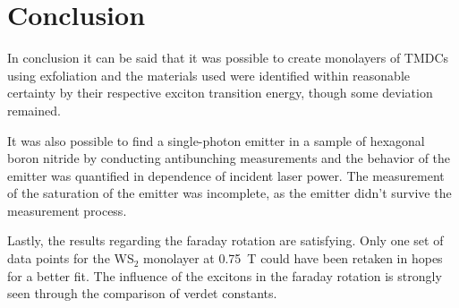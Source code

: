 \newpage
\section{Conclusion}


  In conclusion it can be said that it was possible to create monolayers of TMDCs using exfoliation and the materials used were identified within reasonable certainty by their respective exciton transition energy, though some deviation remained.

  It was also possible to find a single-photon emitter in a sample of hexagonal boron nitride by conducting antibunching measurements and the behavior of the emitter was quantified in dependence of incident laser power.
  The measurement of the saturation of the emitter was incomplete, as the emitter didn't survive the measurement process.

  Lastly, the results regarding the faraday rotation are satisfying. Only one set of data points for the WS$_2$ monolayer at \SI{0.75}{\tesla} could have been retaken in hopes for a better fit.
  The influence of the excitons in the faraday rotation is strongly seen through the comparison of verdet constants.
